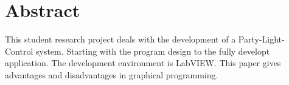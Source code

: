 \thispagestyle{empty}
\label{chap:Abstract}
\section*{Abstract}

This student research project deals with the development of a Party-Light-Control system. Starting with the program design to the fully developt application. The development environment is LabVIEW. This paper gives advantages and disadvantages in graphical programming.


